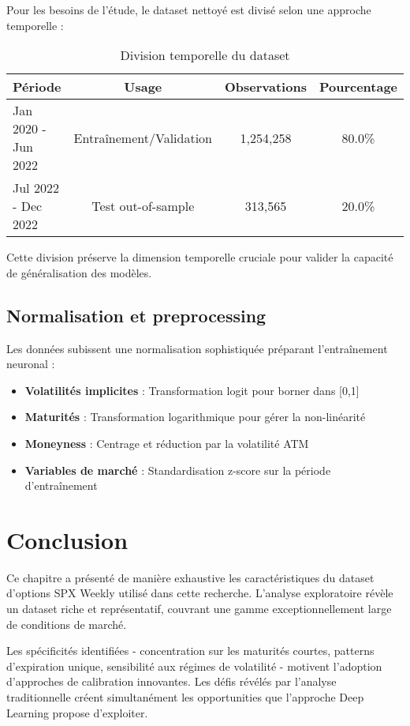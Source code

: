 \begin{table}[H]
\begin{table}[H]
\begin{table}[H]
\begin{table}[H]
Pour les besoins de l'étude, le dataset nettoyé est divisé selon une approche temporelle :

\begin{table}[H]
\centering
\caption{Division temporelle du dataset}
\begin{tabular}{@{}lccc@{}}
\toprule
\textbf{Période} & \textbf{Usage} & \textbf{Observations} & \textbf{Pourcentage} \\
\midrule
Jan 2020 - Jun 2022 & Entraînement/Validation & 1,254,258 & 80.0\% \\
Jul 2022 - Dec 2022 & Test out-of-sample & 313,565 & 20.0\% \\
\bottomrule
\end{tabular}
\end{table}

Cette division préserve la dimension temporelle cruciale pour valider la capacité de généralisation des modèles.

\subsection{Normalisation et preprocessing}

Les données subissent une normalisation sophistiquée préparant l'entraînement neuronal :

\begin{itemize}
\item \textbf{Volatilités implicites} : Transformation logit pour borner dans [0,1]
\item \textbf{Maturités} : Transformation logarithmique pour gérer la non-linéarité
\item \textbf{Moneyness} : Centrage et réduction par la volatilité ATM
\item \textbf{Variables de marché} : Standardisation z-score sur la période d'entraînement
\end{itemize}

\section{Conclusion}

Ce chapitre a présenté de manière exhaustive les caractéristiques du dataset d'options SPX Weekly utilisé dans cette recherche. L'analyse exploratoire révèle un dataset riche et représentatif, couvrant une gamme exceptionnellement large de conditions de marché.

Les spécificités identifiées - concentration sur les maturités courtes, patterns d'expiration unique, sensibilité aux régimes de volatilité - motivent l'adoption d'approches de calibration innovantes. Les défis révélés par l'analyse traditionnelle créent simultanément les opportunities que l'approche Deep Learning propose d'exploiter.


\end{table}
\end{table}
\end{table}
\end{table}
